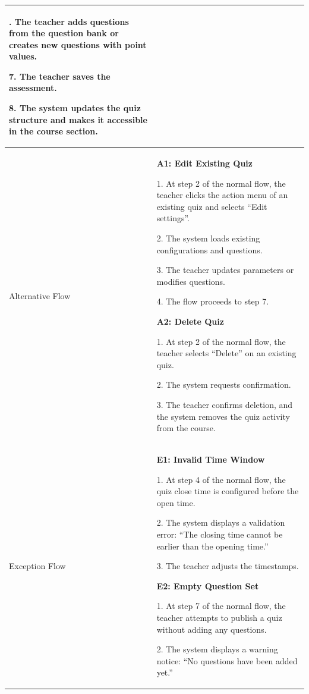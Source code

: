 {\begin{longtable}{|>{\bfseries\raggedright\arraybackslash}p{}|>{\raggedright\arraybackslash}p{}|}
6. The teacher adds questions from the question bank or creates new questions with point values. \par
7. The teacher saves the assessment. \par
8. The system updates the quiz structure and makes it accessible in the course section. \\ \hline
Alternative Flow &
\textbf{A1: Edit Existing Quiz} \par
1. At step 2 of the normal flow, the teacher clicks the action menu of an existing quiz and selects ``Edit settings''. \par
2. The system loads existing configurations and questions. \par
3. The teacher updates parameters or modifies questions. \par
4. The flow proceeds to step 7. \par\vspace{4pt}
\textbf{A2: Delete Quiz} \par
1. At step 2 of the normal flow, the teacher selects ``Delete'' on an existing quiz. \par
2. The system requests confirmation. \par
3. The teacher confirms deletion, and the system removes the quiz activity from the course. \\ \hline
Exception Flow &
\textbf{E1: Invalid Time Window} \par
1. At step 4 of the normal flow, the quiz close time is configured before the open time. \par
2. The system displays a validation error: ``The closing time cannot be earlier than the opening time.'' \par
3. The teacher adjusts the timestamps. \par\vspace{4pt}
\textbf{E2: Empty Question Set} \par
1. At step 7 of the normal flow, the teacher attempts to publish a quiz without adding any questions. \par
2. The system displays a warning notice: ``No questions have been added yet.'' \\ \hline
\end{longtable}
}

